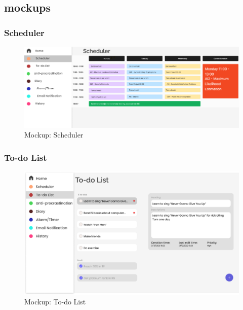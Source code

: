 \documentclass[a4paper]{article}
\begin{document}
\subsection{mockups}

\subsubsection{Scheduler}

\begin{figure}[H] %
	\centering %
	\includegraphics[width=1\textwidth]{./images/Mockup_Scheduler.png} %
	\caption*{Mockup: Scheduler} %
	\label{Fig.Scheduler} %
\end{figure}

\subsubsection{To-do List}

\begin{figure}[H] %
	\centering %
	\includegraphics[width=1\textwidth]{./images/Mockup_Todo_list.png} %
	\caption*{Mockup: To-do List} %
	\label{Fig.todolist} %
\end{figure}
\end{document}
